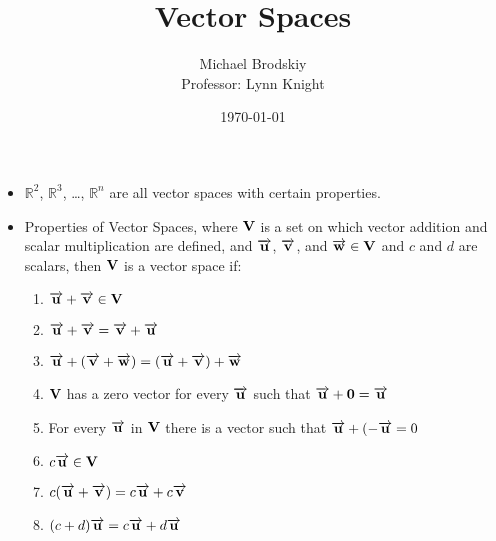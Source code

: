 \documentclass[12pt]{article}
\title{Vector Spaces}
\date{\today}
\author{Michael Brodskiy\\ \small Professor: Lynn Knight}
\begin{document}
\maketitle

\begin{itemize}

  \item $\mathbb{R}^2$, $\mathbb{R}^3$, \dots, $\mathbb{R}^n$ are all vector spaces with certain properties.

  \item Properties of Vector Spaces, where $\bold{V}$ is a set on which vector addition and scalar multiplication are defined, and $\overrightarrow{\bold{u}}$, $\overrightarrow{\bold{v}}$, and $\overrightarrow{\bold{w}} \in \bold{V}$ and $c$ and $d$ are scalars, then $\bold{V}$ is a vector space if:

    \begin{enumerate}

      \item $\overrightarrow{\bold{u}} + \overrightarrow{\bold{v}} \in \bold{V}$

      \item $\overrightarrow{\bold{u}} + \overrightarrow{\bold{v}} = \overrightarrow{\bold{v}} + \overrightarrow{\bold{u}}$

      \item $\overrightarrow{\bold{u}} + (\overrightarrow{\bold{v}} + \overrightarrow{\bold{w}})=(\overrightarrow{\bold{u}} + \overrightarrow{\bold{v}}) + \overrightarrow{\bold{w}}$

      \item  $\bold{V}$ has a zero vector for every $\overrightarrow{\bold{u}}$ such that $\overrightarrow{\bold{u}} + \bold{0} =\overrightarrow{\bold{u}}$

      \item For every $\overrightarrow{\bold{u}}$ in $\bold{V}$ there is a vector such that $\overrightarrow{\bold{u}} + (-\overrightarrow{\bold{u}}=0$

      \item $c\overrightarrow{\bold{u}} \in \bold{V}$ 

      \item $c(\overrightarrow{\bold{u}} + \overrightarrow{\bold{v}})= c\overrightarrow{\bold{u}}+c\overrightarrow{\bold{v}}$

      \item $(c+d)\overrightarrow{\bold{u}}=c\overrightarrow{\bold{u}}+d\overrightarrow{\bold{u}}$


\end{enumerate}
\end{itemize}
\end{document}
